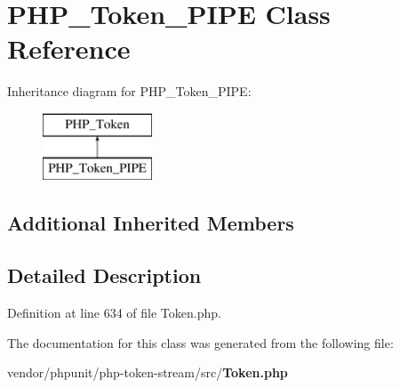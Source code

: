 \section{P\+H\+P\+\_\+\+Token\+\_\+\+P\+I\+P\+E Class Reference}
\label{class_p_h_p___token___p_i_p_e}
Inheritance diagram for P\+H\+P\+\_\+\+Token\+\_\+\+P\+I\+P\+E\+:\begin{figure}[H]
\begin{center}
\leavevmode
\includegraphics[height=2.000000cm]{class_p_h_p___token___p_i_p_e}
\end{center}
\end{figure}
\subsection*{Additional Inherited Members}


\subsection{Detailed Description}


Definition at line 634 of file Token.\+php.



The documentation for this class was generated from the following file\+:\begin{DoxyCompactItemize}
\item 
vendor/phpunit/php-\/token-\/stream/src/{\bf Token.\+php}\end{DoxyCompactItemize}
